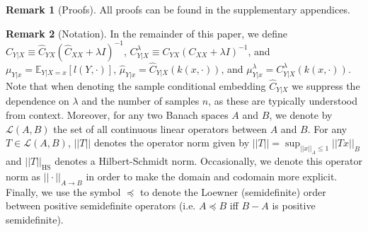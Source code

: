 \documentclass[accepted]{article}
\theoremstyle{definition}
\newtheorem*{remark}{Remark}
\begin{document}

\par 

\begin{remark}[Proofs]
All proofs can be found in the supplementary appendices.
\end{remark}
\begin{remark}[Notation]
In the remainder of this paper, we define $\hat{C}_{Y|X} \equiv \hat{C}_{YX}(\hat{C}_{XX} + \lambda I)^{-1}$, $C^{\lambda}_{Y|X} \equiv C_{YX}(C_{XX} + \lambda I)^{-1}$, and $\mu_{Y|x} = \mathbb{E}_{Y|X = x}[l(Y, \cdot)]$, $\hat{\mu}_{Y|x} = \hat{C}_{Y|X}(k(x, \cdot))$, and $\mu^{\lambda}_{Y|x} = C^{\lambda}_{Y | X}(k(x, \cdot))$. Note that when denoting the sample conditional embedding  $\hat{C}_{Y|X}$ we suppress the dependence on $\lambda$ and the number of samples $n$, as these are typically understood from context. Moreover, for any two Banach spaces $A$ and $B$, we denote by $\mathcal{L}(A, B)$ the set of all continuous linear operators between $A$ and $B$. For any $T \in \mathcal{L}(A, B)$, $||T||$ denotes the operator norm given by $||T|| = \sup_{||x||_{A} \leq 1} ||Tx||_{B}$ and $||T||_{\text{HS}}$ denotes a Hilbert-Schmidt norm. Occasionally, we denote this operator norm as $||\cdot||_{A \to B}$ in order to make the domain and codomain more explicit. Finally, we use the symbol $\preccurlyeq$ to denote the Loewner (semidefinite) order between positive semidefinite operators (i.e. $A \preccurlyeq B$ iff $B - A$ is positive semidefinite). 
\end{remark}
\end{document}
